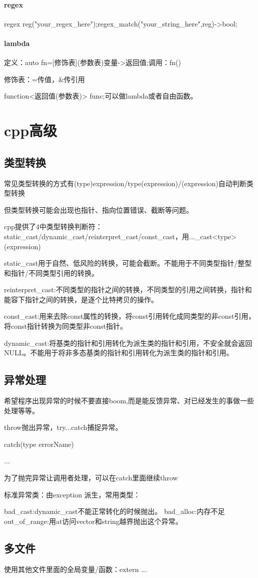 \documentclass[UTF8]{ctexart}
\begin{document}
\paragraph{regex}regex reg("your_regex_here");regex_match("your_string_here",reg)->bool;

\paragraph{lambda}定义：auto fn=[修饰表](参数表){变量}->返回值;调用：fn()

修饰表：=传值，\&传引用

function<返回值(参数表)> func;可以做lambda或者自由函数。

\section{cpp高级}
\subsection{类型转换}
常见类型转换的方式有(type)expression/type(expression)/(expression)自动判断类型转换

但类型转换可能会出现也指针、指向位置错误、截断等问题。

cpp提供了4中类型转换判断符：static_cast/dynamic_cast/reinterpret_cast/const_cast，用..._cast<type>(expression)

static_cast用于自然、低风险的转换，可能会截断。不能用于不同类型指针/整型和指针/不同类型引用的转换。

reinterpret_cast:不同类型的指针之间的转换，不同类型的引用之间转换，指针和能容下指针之间的转换，是逐个比特拷贝的操作。

const_cast:用来去除const属性的转换，将const引用转化成同类型的非const引用，将const指针转换为同类型非const指针。

dynamic_cast:将基类的指针和引用转化为派生类的指针和引用，不安全就会返回NULL。不能用于将非多态基类的指针和引用转化为派生类的指针和引用。

\subsection{异常处理}
希望程序出现异常的时候不要直接boom,而是能反馈异常、对已经发生的事做一些处理等等。

throw抛出异常，try...catch捕捉异常。

catch(type errorName){

  ...

}

为了抛完异常让调用者处理，可以在catch里面继续throw

标准异常类：由exception 派生，常用类型：

bad_cast:dynamic_cast不能正常转化的时候抛出。
bad_alloc:内存不足
out_of_range:用at访问vector和string越界抛出这个异常。

\subsection{多文件}

使用其他文件里面的全局变量/函数：extern ...
\end{document}
